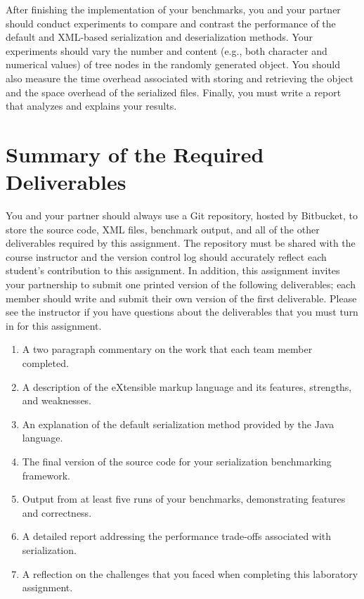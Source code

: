 After finishing the implementation of your benchmarks, you and your partner should conduct experiments to compare and
contrast the performance of the default and XML-based serialization and deserialization methods. Your experiments should
vary the number and content (e.g., both character and numerical values) of tree nodes in the randomly generated object.
You should also measure the time overhead associated with storing and retrieving the object and the space overhead
of the serialized files. Finally, you must write a report that analyzes and explains your results.

\section*{Summary of the Required Deliverables}

You and your partner should always use a Git repository, hosted by Bitbucket, to store the source code, XML files,
benchmark output, and all of the other deliverables required by this assignment. The repository must be shared with the
course instructor and the version control log should accurately reflect each student's contribution to this assignment. In
addition, this assignment invites your partnership to submit one printed version of the following deliverables; each
member should write and submit their own version of the first deliverable. Please see the instructor if you have
questions about the deliverables that you must turn in for this assignment.

\vspace*{-.05in}
\begin{enumerate}
  \setlength{\itemsep}{0pt}
  \item A two paragraph commentary on the work that each team member completed. 
  \item A description of the eXtensible markup language and its features, strengths, and weaknesses.
  \item An explanation of the default serialization method provided by the Java language.
  \item The final version of the source code for your serialization benchmarking framework.
  \item Output from at least five runs of your benchmarks, demonstrating features and correctness.
  \item A detailed report addressing the performance trade-offs associated with serialization.
  \item A reflection on the challenges that you faced when completing this laboratory assignment.
\end{enumerate}
\vspace*{-.05in}

